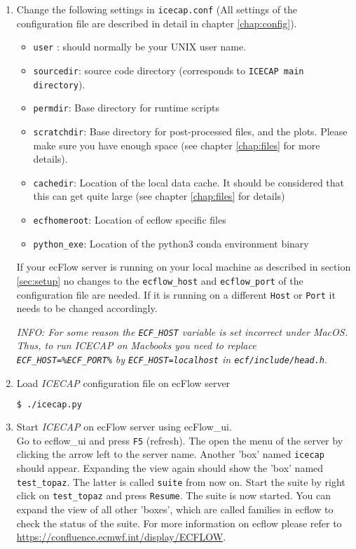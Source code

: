 \documentclass[DIV=10, parskip=full]{scrreprt}
\newcommand{\ice}{\textit{ICECAP}\xspace}
\newcommand{\info}[1]{\textit{INFO: #1}}
\begin{document}
\begin{enumerate}
	\item Change the following settings in \texttt{icecap.conf} (All settings of the configuration file are described in detail in chapter \ref{chap:config}). 
	\begin{itemize}
		\item \texttt{user} : should normally be your UNIX user name. 
		\item \texttt{sourcedir}: source code directory (corresponds to \texttt{ICECAP main directory}).
		\item \texttt{permdir}:  Base directory for runtime scripts 
		\item \texttt{scratchdir}: Base directory for post-processed files, and the plots. Please make sure you have enough space (see chapter \ref{chap:files} for more details). 
		\item \texttt{cachedir}: Location of the local data cache. It should be considered that this can get quite large (see chapter \ref{chap:files} for details)
		\item \texttt{ecfhomeroot}: Location of ecflow specific files
		\item \texttt{python\_exe}: Location of the python3 conda environment binary
	\end{itemize}
	If your ecFlow server is running on your local machine as described in section \ref{sec:setup} no changes to the \texttt{ecflow\_host} and  \texttt{ecflow\_port} of the configuration file are needed. If it is running on a different \texttt{Host} or \texttt{Port} it needs to be changed accordingly.
	
	\info{For some reason the \texttt{ECF\_HOST} variable is set incorrect under MacOS. Thus, to run \ice on Macbooks you need to replace \texttt{ECF\_HOST=\%ECF\_PORT\%} by \texttt{ECF\_HOST=localhost} in \texttt{ecf/include/head.h}}.
	
	\item Load \ice configuration file on ecFlow server\\
	\begin{lstlisting}[language=bash]
		$ ./icecap.py
	\end{lstlisting}
	\item Start \ice on ecFlow server using ecFlow\_ui. \\
	Go to ecflow\_ui and press \texttt{F5} (refresh). The open the menu of the server by clicking the arrow left to the server name. Another 'box' named \texttt{icecap} should appear. Expanding the view again should show the 'box' named \texttt{test\_topaz}. The latter is called \texttt{suite} from now on. Start the suite by  right click on \texttt{test\_topaz} and press \texttt{Resume}. The suite is now started. You can expand the view of all other 'boxes', which are called families in ecflow to check the status of the suite. For more information on ecflow please refer to  \url{https://confluence.ecmwf.int/display/ECFLOW}.
	

\end{enumerate}
\end{document}

